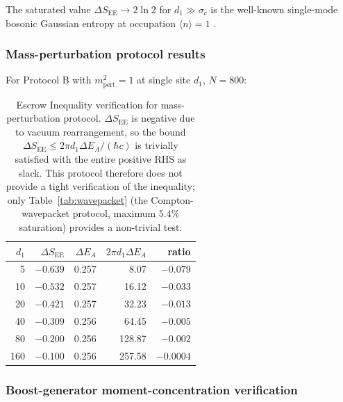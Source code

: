 \documentclass[11pt]{article}
\begin{document}
The saturated value $\Delta S_{\mathrm{EE}} \to 2\ln 2$ for $d_1 \gg \sigma_c$ is the well-known single-mode bosonic Gaussian entropy at occupation $\langle n\rangle = 1$ \cite{AdessoIlluminati2007, HolevoSohma1999}.

\subsubsection{Mass-perturbation protocol results}

For Protocol B with $m_{\mathrm{pert}}^2 = 1$ at single site $d_1$, $N = 800$:

\begin{table}[h]
\centering
\begin{tabular}{rrrrr}
\toprule
$d_1$ & $\Delta S_{\mathrm{EE}}$ & $\Delta E_A$ & $2\pi d_1 \Delta E_A$ & ratio \\
\midrule
5   & $-0.639$ & 0.257 & 8.07 & $-0.079$ \\
10  & $-0.532$ & 0.257 & 16.12 & $-0.033$ \\
20  & $-0.421$ & 0.257 & 32.23 & $-0.013$ \\
40  & $-0.309$ & 0.256 & 64.45 & $-0.005$ \\
80  & $-0.200$ & 0.256 & 128.87 & $-0.002$ \\
160 & $-0.100$ & 0.256 & 257.58 & $-0.0004$ \\
\bottomrule
\end{tabular}
\caption{Escrow Inequality verification for mass-perturbation protocol. $\Delta S_{\mathrm{EE}}$ is negative due to vacuum rearrangement, so the bound $\Delta S_{\mathrm{EE}} \leq 2\pi d_1 \Delta E_A/(\hbar c)$ is trivially satisfied with the entire positive RHS as slack. This protocol therefore does not provide a tight verification of the inequality; only Table~\ref{tab:wavepacket} (the Compton-wavepacket protocol, maximum $5.4\%$ saturation) provides a non-trivial test.}
\label{tab:massp}
\end{table}

\subsubsection{Boost-generator moment-concentration verification}
\end{document}
